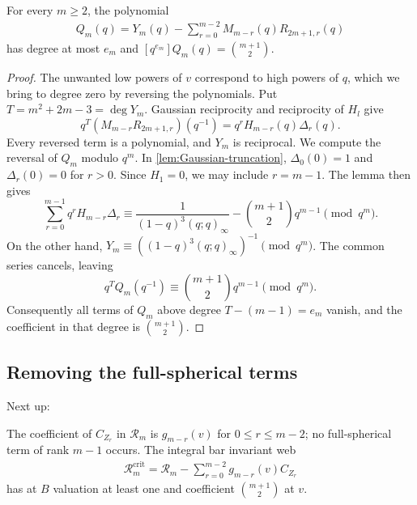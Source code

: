\documentclass[a4paper,11pt]{amsart}
\numberwithin{equation}{subsection}
\theoremstyle{plain}
\theoremstyle{definition}
\theoremstyle{remark}
\begin{document}
\begin{lemma}\label{lem:Gaussian-cancellation}
For every $m\ge2$, the polynomial
\begin{gather*}
Q_m(q)=Y_m(q)-\sum_{r=0}^{m-2}M_{m-r}(q)R_{2m+1,r}(q)
\end{gather*}
has degree at most $e_m$ and
$[q^{e_m}]Q_m(q)=\binom{m+1}{2}$.
\end{lemma}

\begin{proof}
The unwanted low powers of $v$ correspond to high powers of $q$,
which we bring to degree zero by reversing the polynomials. Put
$T=m^2+2m-3=\deg Y_m$. Gaussian reciprocity and reciprocity of
$H_l$ give
\[
q^T(M_{m-r}R_{2m+1,r})(q^{-1})
=q^rH_{m-r}(q)\Delta_r(q).
\]
Every reversed term is a polynomial, and $Y_m$ is reciprocal.
We compute the reversal of $Q_m$ modulo $q^m$.
In \autoref{lem:Gaussian-truncation}, $\Delta_0(0)=1$ and
$\Delta_r(0)=0$ for $r>0$. Since $H_1=0$, we may include $r=m-1$. The lemma then gives
\[
\sum_{r=0}^{m-1}q^rH_{m-r}\Delta_r
\equiv\frac{1}{(1-q)^3(q;q)_\infty}
-\binom{m+1}{2}q^{m-1}\pmod{q^m}.
\]
On the other hand,
$Y_m\equiv((1-q)^3(q;q)_\infty)^{-1}\pmod{q^m}$.
The common series cancels, leaving
\[
q^TQ_m(q^{-1})\equiv\binom{m+1}{2}q^{m-1}\pmod{q^m}.
\]
Consequently all terms of $Q_m$ above degree $T-(m-1)=e_m$
vanish, and the coefficient in that degree is $\binom{m+1}{2}$.
\end{proof}

\subsection{Removing the full-spherical terms}

Next up:

\begin{lemma}\label{prop:full-correction}
The coefficient of $C_{Z_r}$ in $\mathcal R_m$ is $g_{m-r}(v)$
for $0\le r\le m-2$; no full-spherical term of rank $m-1$ occurs.
The integral bar invariant web
\begin{gather*}
\mathcal R_m^{\mathrm{crit}}
=\mathcal R_m-\sum_{r=0}^{m-2}g_{m-r}(v)C_{Z_r}
\end{gather*}
has at $B$ valuation at least one and coefficient
$\binom{m+1}{2}$ at $v$.
\end{lemma}
\end{document}

